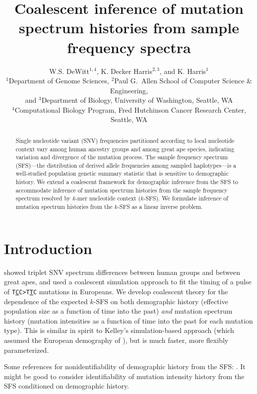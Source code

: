 \documentclass[11pt]{article}
\title{Coalescent inference of mutation spectrum histories from sample frequency spectra}
\author{
W.S. DeWitt$^{1,4}$, K. Decker Harris$^{2,3}$, and K. Harris$^{1}$\\
{\small
$^1$Department of Genome Sciences,
$^2$Paul G.\ Allen School of Computer Science \& Engineering,}\\
{\small and $^3$Department of Biology, University of Washington, Seattle, WA}\\
{\small $^4$Computational Biology Program, Fred Hutchinson Cancer Research Center, Seattle, WA}
}
\begin{document}
\maketitle

\begin{abstract}

Single nucleotide variant (SNV) frequencies partitioned according to local nucleotide context vary among human ancestry groups and among great ape species, indicating variation and divergence of the mutation process.
The sample frequency spectrum (SFS)---the distribution of derived allele frequencies among sampled haplotypes---is a well-studied population genetic summary statistic that is sensitive to demographic history.
We extend a coalescent framework for demographic inference from the SFS to accommodate inference of mutation spectrum histories from the sample frequency spectrum resolved by $k$-mer nucleotide context ($k$-SFS).
We formulate inference of mutation spectrum histories from the $k$-SFS as a linear inverse problem.

\end{abstract}


\section*{Introduction}\label{sec:intro}

\cite{Harris2017-fw} showed triplet SNV spectrum differences between human groups and between great apes, and used a coalescent simulation approach to fit the timing of a pulse of \texttt{T\underline{C}C>T\underline{T}C} mutations in Europeans.
We develop coalescent theory for the dependence of the expected $k$-SFS on both demographic history (effective population size as a function of time into the past) \emph{and} mutation spectrum history (mutation intensities as a function of time into the past for each mutation type).
This is similar in spirit to Kelley's simulation-based approach (which assumed the European demography of \cite{Tennessen2012-dq}), but is much faster, more flexibly parameterized.

Some references for nonidentifiability of demographic history from the SFS: \cite{Baharian2018-np, Bhaskar2014-fu, Terhorst2015-xt, Myers2008-jp}.
It might be good to consider identifiability of mutation intensity history from the SFS conditioned on demographic history.

\end{document}
